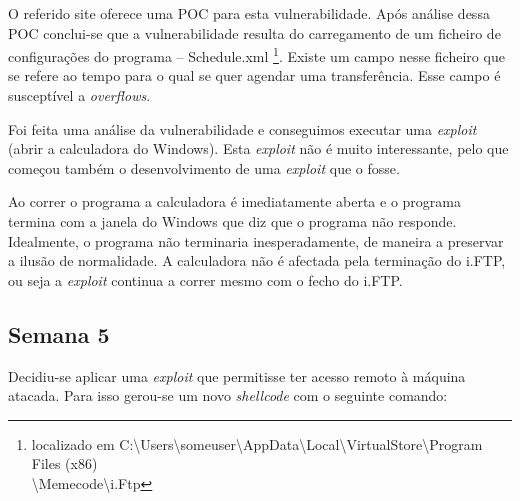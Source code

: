 \documentclass[a4paper]{article}
\begin{document}
O referido site oferece uma POC para esta vulnerabilidade. Após análise dessa POC conclui-se que a vulnerabilidade resulta do carregamento de um ficheiro de configurações do programa -- Schedule.xml \footnote{localizado em C:\textbackslash Users\textbackslash someuser\textbackslash AppData\textbackslash Local\textbackslash VirtualStore\textbackslash Program Files (x86)\\ \textbackslash Memecode\textbackslash i.Ftp}. Existe um campo nesse ficheiro que se refere ao tempo para o qual se quer agendar uma transferência. Esse campo é susceptível a \textit{overflows}.

Foi feita uma análise da vulnerabilidade e conseguimos executar uma \textit{exploit} (abrir a calculadora do Windows). Esta \textit{exploit} não é muito interessante, pelo que começou também o desenvolvimento de uma \textit{exploit} que o fosse.

Ao correr o programa a calculadora é imediatamente aberta e o programa termina com a janela do Windows que diz que o programa não responde. Idealmente, o programa não terminaria inesperadamente, de maneira a preservar a ilusão de normalidade. A calculadora não é afectada pela terminação do i.FTP, ou seja a \textit{exploit} continua a correr mesmo com o fecho do i.FTP.


\subsection{Semana 5}

Decidiu-se aplicar uma \textit{exploit} que permitisse ter acesso remoto à máquina atacada. Para isso gerou-se um novo \textit{shellcode} com o seguinte comando:
\end{document}
